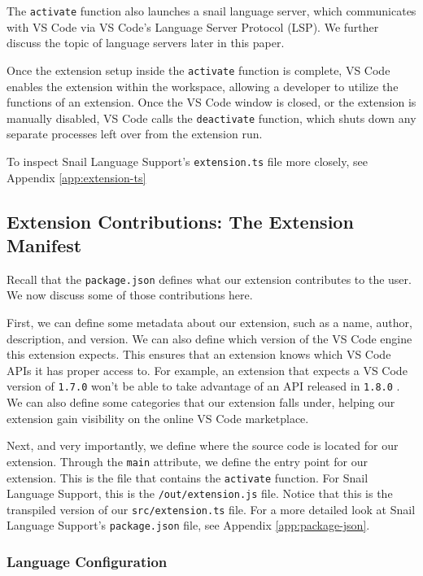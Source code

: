\documentclass{article}
\begin{document}
The \lstinline{activate} function also launches a snail language server, which communicates with VS Code via VS Code's Language Server Protocol (LSP). We further discuss the topic of language servers later in this paper.

Once the extension setup inside the \lstinline{activate} function is complete, VS Code enables the extension within the workspace, allowing a developer to utilize the functions of an extension. Once the VS Code window is closed, or the extension is manually disabled, VS Code calls the \lstinline{deactivate} function, which shuts down any separate processes left over from the extension run.

To inspect Snail Language Support's \lstinline{extension.ts} file more closely, see Appendix \ref{app:extension-ts}

\subsection{Extension Contributions: The Extension Manifest}

Recall that the \lstinline{package.json} defines what our extension contributes to the user. We now discuss some of those contributions here.

First, we can define some metadata about our extension, such as a name, author, description, and version. We can also define which version of the VS Code engine this extension expects. This ensures that an extension knows which VS Code APIs it has proper access to. For example, an extension that expects a VS Code version of \lstinline{1.7.0} won't be able to take advantage of an API released in \lstinline{1.8.0} \cite{Microsoft_2023e}. We can also define some categories that our extension falls under, helping our extension gain visibility on the online VS Code marketplace.

Next, and very importantly, we define where the source code is located for our extension. Through the \lstinline{main} attribute, we define the entry point for our extension. This is the file that contains the \lstinline{activate} function. For Snail Language Support, this is the \lstinline{/out/extension.js} file. Notice that this is the transpiled version of our \lstinline{src/extension.ts} file. For a more detailed look at Snail Language Support's \lstinline{package.json} file, see Appendix \ref{app:package-json}.

\subsubsection{Language Configuration}
\end{document}
